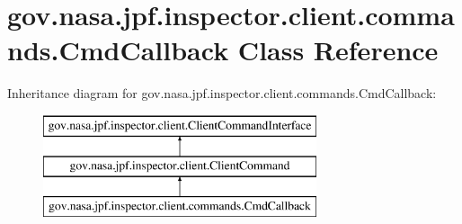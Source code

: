 \hypertarget{classgov_1_1nasa_1_1jpf_1_1inspector_1_1client_1_1commands_1_1_cmd_callback}{}\section{gov.\+nasa.\+jpf.\+inspector.\+client.\+commands.\+Cmd\+Callback Class Reference}
\label{classgov_1_1nasa_1_1jpf_1_1inspector_1_1client_1_1commands_1_1_cmd_callback}
Inheritance diagram for gov.\+nasa.\+jpf.\+inspector.\+client.\+commands.\+Cmd\+Callback\+:\begin{figure}[H]
\begin{center}
\leavevmode
\includegraphics[height=3.000000cm]{classgov_1_1nasa_1_1jpf_1_1inspector_1_1client_1_1commands_1_1_cmd_callback}
\end{center}
\end{figure}
